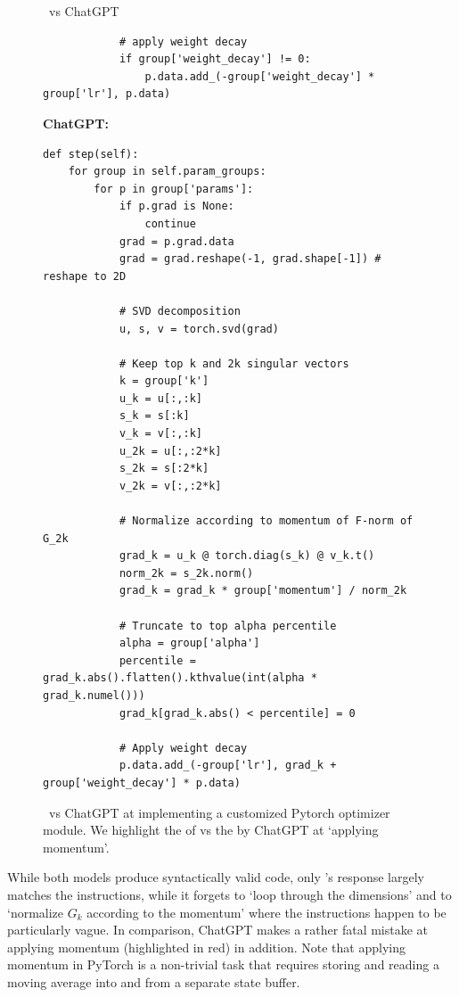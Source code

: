 \begin{figure}[H]
\begin{AIbox}{\DV~vs ChatGPT}
\begin{minipage}[t]{0.5\linewidth}
\begin{verbatim}
            # apply weight decay
            if group['weight_decay'] != 0:
                p.data.add_(-group['weight_decay'] * group['lr'], p.data)
\end{verbatim}
\end{minipage}
\begin{minipage}[t]{0.5\linewidth}
{\bf ChatGPT:}
\begin{verbatim}
def step(self):
    for group in self.param_groups:
        for p in group['params']:
            if p.grad is None:
                continue
            grad = p.grad.data
            grad = grad.reshape(-1, grad.shape[-1]) # reshape to 2D
            
            # SVD decomposition
            u, s, v = torch.svd(grad)
            
            # Keep top k and 2k singular vectors
            k = group['k']
            u_k = u[:,:k]
            s_k = s[:k]
            v_k = v[:,:k]
            u_2k = u[:,:2*k]
            s_2k = s[:2*k]
            v_2k = v[:,:2*k]
            
            # Normalize according to momentum of F-norm of G_2k
            grad_k = u_k @ torch.diag(s_k) @ v_k.t()
            norm_2k = s_2k.norm()
            grad_k = grad_k * group['momentum'] / norm_2k
            
            # Truncate to top alpha percentile
            alpha = group['alpha']
            percentile = grad_k.abs().flatten().kthvalue(int(alpha * grad_k.numel()))
            grad_k[grad_k.abs() < percentile] = 0
            
            # Apply weight decay
            p.data.add_(-group['lr'], grad_k + group['weight_decay'] * p.data)
\end{verbatim}
\end{minipage}
\end{AIbox}
\caption{\DV~vs ChatGPT at implementing a customized Pytorch optimizer module. We highlight the  of \DV vs the  by ChatGPT at `applying momentum'. }
\label{fig:deeplearning}
\end{figure}


While both models produce syntactically valid code, only \DV's response largely matches the instructions, while it forgets to `loop through the dimensions' and to `normalize $G_k$ according to the momentum' where the instructions happen to be particularly vague. In comparison, ChatGPT makes a rather fatal mistake at applying momentum (highlighted in red) in addition. Note that applying momentum in PyTorch is a non-trivial task that requires storing and reading a moving average into and from a separate state buffer.


